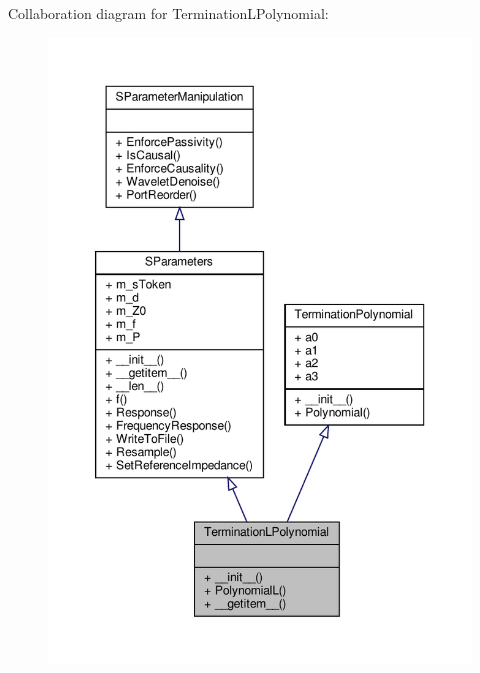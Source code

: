 Collaboration diagram for Termination\+L\+Polynomial\+:
\nopagebreak
\begin{figure}[H]
\begin{center}
\leavevmode
\includegraphics[width=350pt]{classSignalIntegrity_1_1Measurement_1_1CalKit_1_1Standards_1_1TerminationPolynomial_1_1TerminationLPolynomial__coll__graph}
\end{center}
\end{figure}

